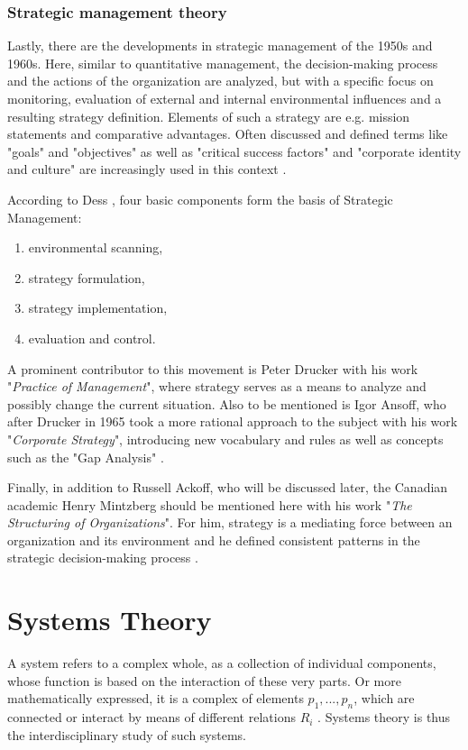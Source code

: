 \documentclass[a4paper,12pt]{article}
\begin{document}
\subsubsection{Strategic management theory}
Lastly, there are the developments in strategic management of the 1950s and
1960s. Here, similar to quantitative management, the decision-making process
and the actions of the organization are analyzed, but with a specific focus on
monitoring, evaluation of external and internal environmental influences and a
resulting strategy definition. Elements of such a strategy are e.g. mission
statements and comparative advantages. Often discussed and defined terms like
"goals" and "objectives" as well as "critical success factors" and "corporate
identity and culture" are increasingly used in this context
\cite{pindur:1995}.

According to Dess \cite{dess:1993}, four basic components form the basis of
Strategic Management:
\begin{enumerate}[noitemsep]
\item environmental scanning,
\item strategy formulation,
\item strategy implementation,
\item evaluation and control.
\end{enumerate}

A prominent contributor to this movement is Peter Drucker with his work
"\textit{Practice of Management}", where strategy serves as a means to analyze
and possibly change the current situation. Also to be mentioned is Igor
Ansoff, who after Drucker in 1965 took a more rational approach to the subject
with his work "\textit{Corporate Strategy}", introducing new vocabulary and
rules as well as concepts such as the "Gap Analysis" \cite{ansoff:1965}.

Finally, in addition to Russell Ackoff, who will be discussed later, the
Canadian academic Henry Mintzberg should be mentioned here with his work
"\textit{The Structuring of Organizations}". For him, strategy is a mediating
force between an organization and its environment and he defined consistent
patterns in the strategic decision-making process \cite{pindur:1995}. 

\section{Systems Theory}

A system refers to a complex whole, as a collection of individual components,
whose function is based on the interaction of these very parts. Or more
mathematically expressed, it is a complex of elements $p_{1},...,p_{n}$, which
are connected or interact by means of different relations $R_{i}$
\cite{bertalanffy:1950}. Systems theory is thus the interdisciplinary study of
such systems.
\end{document}
